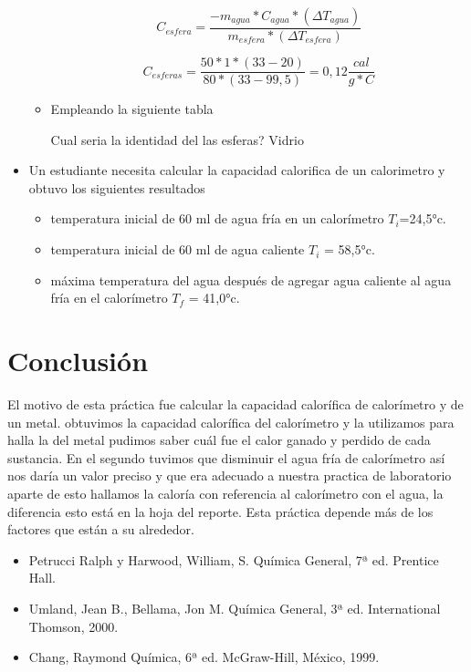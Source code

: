 \documentclass{article}
\begin{document}
\begin{multicols}{2}
\begin{itemize}
\begin{itemize}
    \[C_{esfera}=\frac{- m_{agua}*C_{agua}*(\Delta T_{agua})}{m_{esfera}* (\Delta T_{esfera})}\]
    
    \[C_{esferas}=\frac{50*1*(33-20)}{80*(33-99,5)}=0,12 \frac{cal}{g*C}\]
    
    \item Empleando la siguiente tabla
    
    
    Cual seria la identidad del las esferas?
    \R Vidrio
\end{itemize}
    
    
    \item Un estudiante necesita calcular la capacidad calorifica de un calorimetro y obtuvo los siguientes resultados
    
    \begin{itemize}
        \item temperatura inicial de 60 ml de agua fría en un calorímetro $T_{i} $=24,5°c.
\item temperatura inicial de 60 ml de agua caliente $T_{i} $ = 58,5°c.
\item máxima temperatura del agua después de agregar agua caliente al agua fría en el calorímetro $T_{f}$ = 41,0°c.

    \end{itemize}

\end{itemize}



\section*{Conclusión}
El motivo de esta práctica fue calcular la capacidad calorífica de calorímetro y de un metal. obtuvimos la capacidad calorífica del calorímetro y la utilizamos para halla la del metal pudimos saber cuál fue el calor ganado y perdido de cada sustancia. En el segundo tuvimos que disminuir el agua fría de calorímetro así nos daría un valor preciso y que era adecuado a nuestra practica de laboratorio aparte de esto hallamos la caloría con referencia al calorímetro con el agua, la diferencia esto está en la hoja del reporte. Esta práctica depende más de los factores que están a su alrededor.

 
 

\end{multicols}

\begin{itemize}
 
 \item Petrucci Ralph y Harwood, William, S. Química General, 7ª ed. Prentice Hall.
 \item Umland, Jean B., Bellama, Jon M. Química General, 3ª ed. International Thomson, 2000.
 \item Chang, Raymond Química, 6ª ed. McGraw-Hill, México, 1999.
 \end{itemize}
\end{document}

